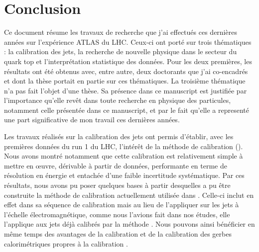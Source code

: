 \chapter*{Conclusion}

Ce document r\'esume les travaux de recherche que j'ai effectu\'es ces derni\`eres ann\'ees sur l'exp\'erience ATLAS du LHC. 
Ceux-ci ont port\'e sur trois th\'ematiques : la calibration des jets, la recherche de nouvelle physique dans le secteur du quark top et l'interpr\'etation statistique des donn\'ees. 
Pour les deux premi\`eres, les r\'esultats ont \'et\'e obtenus avec, entre autre, deux doctorants que j'ai co-encadr\'es et dont la th\`ese portait en partie sur ces th\'ematiques.
La troisi\`eme th\'ematique n'a pas fait l'objet d'une th\`ese. Sa pr\'esence dans ce manuscript est justifi\'ee par l'importance qu'elle rev\^et dans toute recherche en physique des particules, notamment celle pr\'esent\'ee dans ce manuscript, et par le fait qu'elle a represent\'e une part significative de mon travail ces derni\`eres ann\'ees.

Les travaux r\'ealis\'es sur la calibration des jets ont permis d'\'etablir, avec les premi\`eres donn\'ees du run 1 du LHC, l'int\'er\^et de la m\'ethode de calibration \GS{} (). 
Nous avons montr\'e notamment que cette calibration est relativement simple \`a mettre en \oe uvre, d\'erivable \`a partir de donn\'ees, performante en terme de r\'esolution en \'energie et entach\'ee d'une faible incertitude syst\'ematique. 
Par ces r\'esultats, nous avons pu poser quelques bases \`a partir desquelles a pu \^etre construite la m\'ethode de calibration actuellement utilis\'ee dans \ATLAS. 
Celle-ci inclut en effet \GS{} dans sa s\'equence de calibration mais au lieu de l'appliquer sur les jets \`a l'\'echelle \'electromagn\'etique, comme nous l'avions fait dans nos \'etudes, elle l'applique aux jets d\'ej\`a calibr\'es par la m\'ethode \LCW. 
Nous pouvons ainsi b\'en\'eficier en m\^eme temps des avantages de la calibration \GS{} et de la calibration des gerbes calorim\'etriques propres \`a la calibration \LCW{}.

